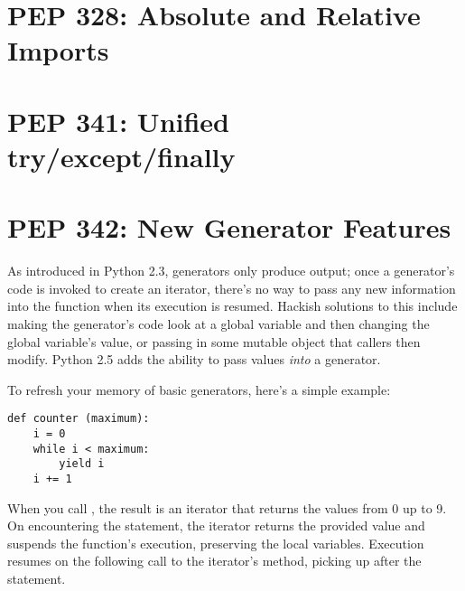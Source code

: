 \documentclass{howto}
\begin{document}
 
\begin{seealso}


\end{seealso}


\section{PEP 328: Absolute and Relative Imports}



\section{PEP 341: Unified try/except/finally}



\section{PEP 342: New Generator Features}

As introduced in Python 2.3, generators only produce output; once a
generator's code is invoked to create an iterator, there's no way to
pass any new information into the function when its execution is
resumed.  Hackish solutions to this include making the generator's
code look at a global variable and then changing the global variable's
value, or passing in some mutable object that callers then modify.
Python 2.5 adds the ability to pass values \emph{into} a generator.

To refresh your memory of basic generators, here's a simple example:

\begin{verbatim}
def counter (maximum):
    i = 0
    while i < maximum:
        yield i
	i += 1
\end{verbatim}

When you call , the result is an iterator that
returns the values from 0 up to 9.  On encountering the
 statement, the iterator returns the provided value and
suspends the function's execution, preserving the local variables.
Execution resumes on the following call to the iterator's 
 method, picking up after the  statement.
\end{document}

